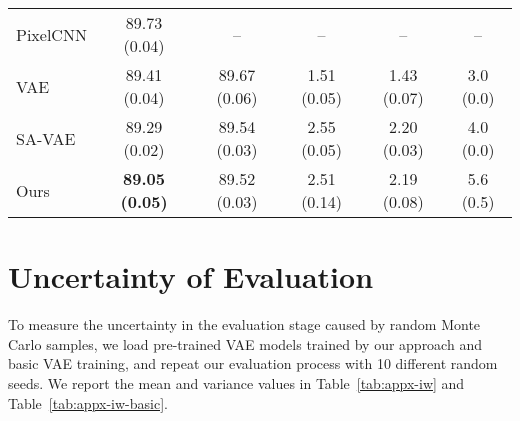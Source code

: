 \documentclass{article} \usepackage{iclr2019_conference,times}
\begin{document}
\begin{table}[h]
{\begin{tabular}{lccccc}
    PixelCNN             &89.73 (0.04)        &--        &--    &--   &-- \\
    VAE                         &89.41 (0.04) &89.67 (0.06) &1.51 (0.05) & 1.43 (0.07)   &3.0 (0.0) \\
    SA-VAE                      &89.29 (0.02)  &89.54 (0.03)   &2.55 (0.05)   &2.20 (0.03) &4.0 (0.0)   \\
    Ours                        &\textbf{89.05 (0.05)}  &89.52 (0.03)  &2.51 (0.14)   &2.19 (0.08) &5.6 (0.5)   \\    
    \bottomrule
    \end{tabular}}
\end{table}

\section{Uncertainty of Evaluation}\label{apdix:iw}
To measure the uncertainty in the evaluation stage caused by random Monte Carlo samples, we load pre-trained VAE models trained by our approach and basic VAE training, and repeat our evaluation process with 10 different random seeds. We report the mean and variance values in Table~\ref{tab:appx-iw} and Table~\ref{tab:appx-iw-basic}.

\begin{table}[h]
    \centering
    \caption{Evaluation of a trained VAE model trained by our approach across 10 different random seeds. Mean values are reported and variance is given in parentheses. IW denotes the approximation to NLL we used in Section~\ref{sec:expresults}. }
    \label{tab:appx-iw}
\end{table}
\end{document}
